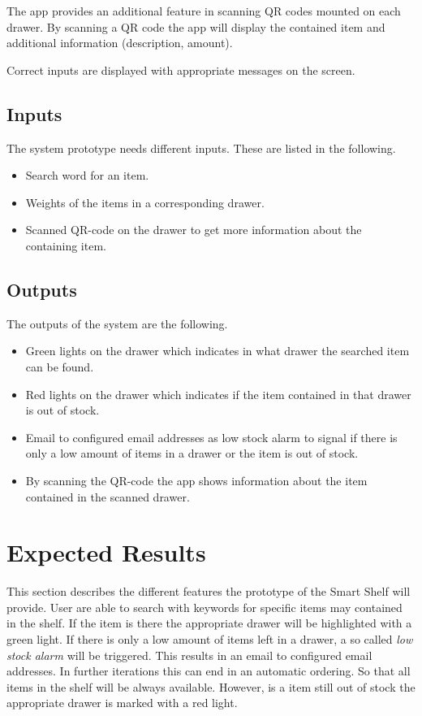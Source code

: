 \documentclass{sigchi}
\begin{document}
The app provides an additional feature in scanning QR codes mounted on each drawer. 
By scanning a QR code the app will display the contained item and additional information (description, amount). 

Correct inputs are displayed with appropriate messages on the screen. 


\subsection{Inputs}
The system prototype needs different inputs. 
These are listed in the following. 
%
\begin{itemize}
	\item Search word for an item. 
	\item Weights of the items in a corresponding drawer. 
	\item Scanned QR-code on the drawer to get more information about the containing item. 
\end{itemize}


\subsection{Outputs}
The outputs of the system are the following. 
%
\begin{itemize}
	\item Green lights on the drawer which indicates in what drawer the searched item can be found. 
	\item Red lights on the drawer which indicates if the item contained in that drawer is out of stock. 
	\item Email to configured email addresses as \glqq{}low stock alarm\grqq{} to signal if there is only a low amount of items in a drawer or the item is out of stock. 
	\item By scanning the QR-code the app shows information about the item contained in the scanned drawer. 
\end{itemize}


\section{Expected Results}
This section describes the different features the prototype of the Smart Shelf will provide. 
User are able to search with keywords for specific items may contained in the shelf. 
If the item is there the appropriate drawer will be highlighted with a green light. 
If there is only a low amount of items left in a drawer, a so called \textit{low stock alarm} will be triggered. 
This results in an email to configured email addresses. 
In further iterations this can end in an automatic ordering. 
So that all items in the shelf will be always available. 
However, is a item still out of stock the appropriate drawer is marked with a red light. 
\end{document}
